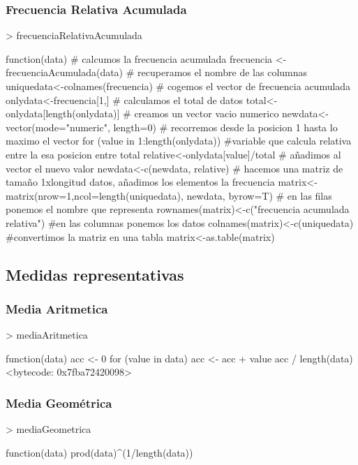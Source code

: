 \documentclass [a4paper] {article}
\begin{document}
\begin{center}
\subsubsection{Frecuencia Relativa Acumulada}
\begin{Schunk}
\begin{Sinput}
> frecuenciaRelativaAcumulada
\end{Sinput}
\begin{Soutput}
function(data){
    # calcumos la frecuencia acumulada
    frecuencia <-frecuenciaAcumulada(data)
    # recuperamos el nombre de las columnas
    uniquedata<-colnames(frecuencia)
    # cogemos el vector de frecuencia acumulada
    onlydata<-frecuencia[1,]
    # calculamos el total de datos 
    total<-onlydata[length(onlydata)]
    # creamos un vector vacio numerico
    newdata<- vector(mode="numeric", length=0)
    # recorremos desde la posicion 1 hasta lo maximo el vector
    for (value in 1:length(onlydata)) {
        #variable que calcula relativa entre la esa posicion entre total 
        relative<-onlydata[value]/total
        # añadimos al vector el nuevo valor
        newdata<-c(newdata, relative)
    }
    # hacemos una matriz de tamaño 1xlongitud datos, añadimos los elementos la frecuencia
  matrix<-matrix(nrow=1,ncol=length(uniquedata), newdata, byrow=T)
  # en las filas ponemos el nombre que representa
  rownames(matrix)<-c("frecuencia acumulada relativa")
  #en las columnas ponemos los datos
  colnames(matrix)<-c(uniquedata)
  #convertimos la matriz en una tabla
  matrix<-as.table(matrix)
}
\end{Soutput}
\end{Schunk}
\subsection{Medidas representativas}
\subsubsection{Media Aritmetica}
\begin{Schunk}
\begin{Sinput}
> mediaAritmetica
\end{Sinput}
\begin{Soutput}
function(data){
  acc <- 0
  for (value in data) {
    acc <- acc + value
  }
  acc / length(data)
}
<bytecode: 0x7fba72420098>
\end{Soutput}
\end{Schunk}
\subsubsection{Media Geométrica}
\begin{Schunk}
\begin{Sinput}
> mediaGeometrica
\end{Sinput}
\begin{Soutput}
function(data){
  prod(data)^(1/length(data))
}
\end{Soutput}
\end{Schunk}

\end{center}
\end{document}
